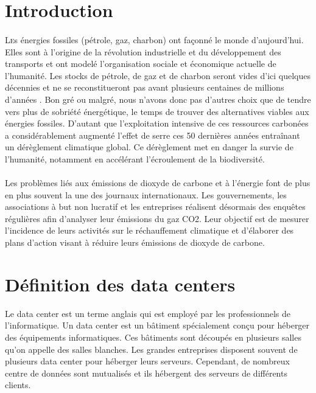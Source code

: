 \section{Introduction}
\begin{onehalfspace}
\paragraph{}\lettrine[nindent=1em,lines=3]{L}es énergies fossiles (pétrole, gaz, charbon) ont façonné le monde d’aujourd’hui. Elles sont à l’origine de la révolution industrielle et du développement des transports et ont modelé l’organisation sociale et économique actuelle de l’humanité. Les stocks de pétrole, de gaz et de charbon seront vides d’ici quelques décennies et ne se reconstitueront pas avant plusieurs centaines de millions d’années \cite{WEB46}. Bon gré ou malgré, nous n’avons donc pas d'autres choix que de tendre vers plus de sobriété énergétique, le temps de trouver des alternatives viables aux énergies fossiles. D’autant que l’exploitation intensive de ces ressources carbonées a considérablement augmenté l’effet de serre ces 50 dernières années entraînant un dérèglement climatique global. Ce dérèglement met en danger la survie de l’humanité, notamment en accélérant l’écroulement de la biodiversité.
\paragraph{}Les problèmes liés aux émissions de dioxyde de carbone et à l’énergie font de plus en plus souvent la une des journaux internationaux. Les gouvernements, les associations à but non lucratif et les entreprises réalisent désormais des enquêtes régulières afin d’analyser leur émissions du gaz CO2. Leur objectif est de mesurer l’incidence de leurs activités sur le réchauffement climatique et d’élaborer des plans d’action visant à réduire leurs émissions de dioxyde de carbone.

\end{onehalfspace}
\section{Définition des data centers}
\begin{onehalfspace}
Le data center est un terme anglais qui est employé par les professionnels de l’informatique. Un data center est un bâtiment spécialement conçu pour héberger des équipements informatiques. Ces bâtiments sont découpés en plusieurs salles qu’on appelle des salles blanches. Les grandes entreprises disposent souvent de plusieurs data center pour héberger leurs serveurs. Cependant, de nombreux centre de données sont mutualisés et ils hébergent des serveurs de différents clients.

\end{onehalfspace}
